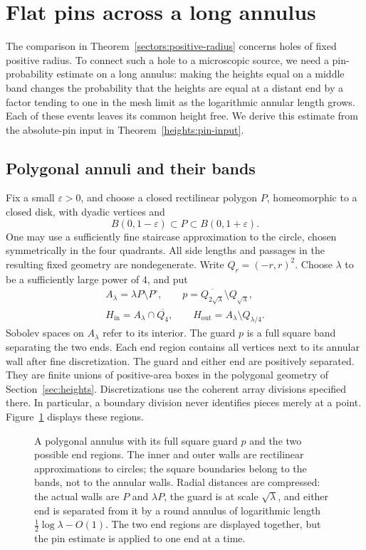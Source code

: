 \section{Flat pins across a long annulus}\label{sec:annuli}

The comparison in Theorem~\ref{sectors:positive-radius} concerns holes of
fixed positive radius. To connect such a hole to a microscopic source,
we need a pin-probability estimate on a long annulus: making the heights
equal on a middle band changes the probability that the heights are
equal at a distant end by a factor tending to one in the mesh limit
as the logarithmic annular length grows. Each of these events leaves
its common height free. We derive this estimate from
the absolute-pin input in Theorem~\ref{heights:pin-input}.

\subsection{Polygonal annuli and their bands}

Fix a small \(\varepsilon>0\), and choose a closed rectilinear polygon
\(P\), homeomorphic to a closed disk, with dyadic vertices and
\[
 B(0,1-\varepsilon)\subset P\subset B(0,1+\varepsilon).
\]
One may use a sufficiently fine staircase approximation to the circle,
chosen symmetrically in the four quadrants. All side lengths and
passages in the resulting fixed geometry are nondegenerate. Write
\(Q_r=(-r,r)^2\). Choose \(\lambda\) to be a sufficiently large power
of \(4\), and put
\[
 \begin{gathered}
 A_\lambda=\lambda P\setminus P^\circ,\qquad
 p=\overline{Q_{2\sqrt\lambda}}\setminus Q_{\sqrt\lambda},\\
 H_{\mathrm{in}}=A_\lambda\cap\overline{Q_4},\qquad
 H_{\mathrm{out}}=A_\lambda\setminus Q_{\lambda/4}.
 \end{gathered}
\]
Sobolev spaces on \(A_\lambda\) refer to its interior.
The guard \(p\) is a full square band separating the two ends.
Each end region contains all vertices next to its annular wall after
fine discretization. The guard and either end are positively separated.
They are finite unions of positive-area boxes in the polygonal
geometry of Section~\ref{sec:heights}. Discretizations use the coherent
array divisions specified there. In particular, a boundary division
never identifies pieces merely at a point.
Figure~\ref{annuli:figure} displays these regions.

\begin{figure}[tb]
 \centering
 
 \caption{A polygonal annulus with its full square guard \(p\) and the
 two possible end regions. The inner and outer walls are rectilinear
 approximations to circles; the square boundaries belong to the
 bands, not to the annular walls. Radial distances are compressed:
 the actual walls are \(P\) and \(\lambda P\), the guard is at scale
 \(\sqrt\lambda\), and either end is separated from it by a round
 annulus of logarithmic length
 \(\frac12\log\lambda-O(1)\). The two end regions are displayed
 together, but the pin estimate is applied to one end at a time.}
 \label{annuli:figure}
\end{figure}

